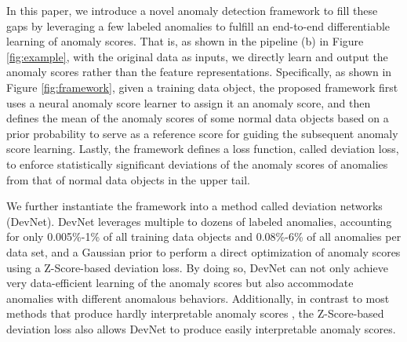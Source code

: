 \documentclass[sigconf]{acmart}
\begin{document}
In this paper, we introduce a novel anomaly detection framework to fill these gaps by leveraging a few labeled anomalies to fulfill an end-to-end differentiable learning of anomaly scores. That is, as shown in the pipeline (b) in Figure \ref{fig:example}, with the original data as inputs, we directly learn and output the anomaly scores rather than the feature representations. Specifically, as shown in Figure \ref{fig:framework}, given a training data object, the proposed framework first uses a neural anomaly score learner to assign it an anomaly score, and then defines the mean of the anomaly scores of some normal data objects based on a prior probability to serve as a reference score for guiding the subsequent anomaly score learning. Lastly, the framework defines a loss function, called deviation loss, to enforce statistically significant deviations of the anomaly scores of anomalies from that of normal data objects in the upper tail.

We further instantiate the framework into a method called deviation networks (DevNet). DevNet leverages multiple to dozens of labeled anomalies, accounting for only 0.005\%-1\% of all training data objects and 0.08\%-6\% of all anomalies per data set, and a Gaussian prior to perform a direct optimization of anomaly scores using a Z-Score-based deviation loss. By doing so, DevNet can not only achieve very data-efficient learning of the anomaly scores but also accommodate anomalies with different anomalous behaviors. Additionally, in contrast to most methods that produce hardly interpretable anomaly scores \cite{kriegel2011interpreting}, the Z-Score-based deviation loss also allows DevNet to produce easily interpretable anomaly scores.
\end{document}
